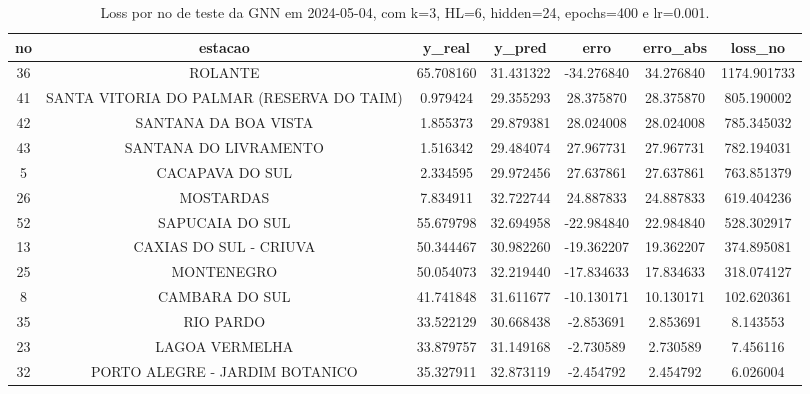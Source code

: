 \begin{table}[h]
\centering
\caption{Loss por no de teste da GNN em 2024-05-04, com k=3, HL=6, hidden=24, epochs=400 e lr=0.001.}
\label{tab:gnn_loss_k3_hl6_h24_e400_d20240504}
\begin{tabular}{ccccccc}
\toprule
no & estacao & y\_real & y\_pred & erro & erro\_abs & loss\_no \\
\midrule
36 & ROLANTE & 65.708160 & 31.431322 & -34.276840 & 34.276840 & 1174.901733 \\
41 & SANTA VITORIA DO PALMAR (RESERVA DO TAIM) & 0.979424 & 29.355293 & 28.375870 & 28.375870 & 805.190002 \\
42 & SANTANA DA BOA VISTA & 1.855373 & 29.879381 & 28.024008 & 28.024008 & 785.345032 \\
43 & SANTANA DO LIVRAMENTO & 1.516342 & 29.484074 & 27.967731 & 27.967731 & 782.194031 \\
5 & CACAPAVA DO SUL & 2.334595 & 29.972456 & 27.637861 & 27.637861 & 763.851379 \\
26 & MOSTARDAS & 7.834911 & 32.722744 & 24.887833 & 24.887833 & 619.404236 \\
52 & SAPUCAIA DO SUL & 55.679798 & 32.694958 & -22.984840 & 22.984840 & 528.302917 \\
13 & CAXIAS DO SUL - CRIUVA & 50.344467 & 30.982260 & -19.362207 & 19.362207 & 374.895081 \\
25 & MONTENEGRO & 50.054073 & 32.219440 & -17.834633 & 17.834633 & 318.074127 \\
8 & CAMBARA DO SUL & 41.741848 & 31.611677 & -10.130171 & 10.130171 & 102.620361 \\
35 & RIO PARDO & 33.522129 & 30.668438 & -2.853691 & 2.853691 & 8.143553 \\
23 & LAGOA VERMELHA & 33.879757 & 31.149168 & -2.730589 & 2.730589 & 7.456116 \\
32 & PORTO ALEGRE - JARDIM BOTANICO & 35.327911 & 32.873119 & -2.454792 & 2.454792 & 6.026004 \\
\bottomrule
\end{tabular}
\end{table}
